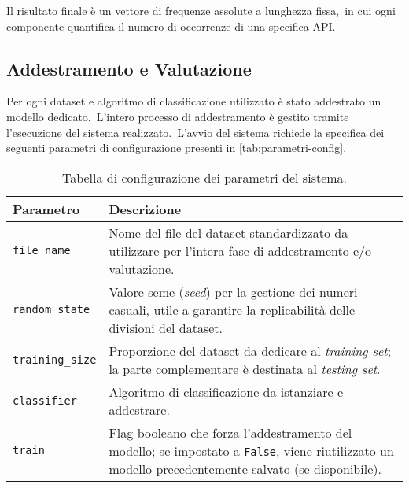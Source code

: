 Il risultato finale è un vettore di frequenze assolute a lunghezza fissa,\
in cui ogni componente quantifica il numero di occorrenze di una specifica API.

\subsection{Addestramento e Valutazione}

Per ogni dataset e algoritmo di classificazione utilizzato è stato addestrato un modello dedicato.\
L'intero processo di addestramento è gestito tramite l'esecuzione del sistema realizzato.\
L'avvio del sistema richiede la specifica dei seguenti parametri di configurazione presenti in \autoref{tab:parametri-config}.

\begin{table}[h!]
    \centering
    \begin{tabular}{lp{10cm}}
        \hline
        \textbf{Parametro}      & \textbf{Descrizione}                                                                                                                                        \\
        \hline
        \texttt{file\_name}     & Nome del file del dataset standardizzato da utilizzare per l’intera fase di addestramento e/o valutazione.                                                  \\[0.5em]
        \texttt{random\_state}  & Valore seme (\textit{seed}) per la gestione dei numeri casuali, utile a garantire la replicabilità delle divisioni del dataset.                             \\[0.5em]
        \texttt{training\_size} & Proporzione del dataset da dedicare al \textit{training set}; la parte complementare è destinata al \textit{testing set}.                                   \\[0.5em]
        \texttt{classifier}     & Algoritmo di classificazione da istanziare e addestrare.                                                                                                    \\[0.5em]
        \texttt{train}          & Flag booleano che forza l’addestramento del modello; se impostato a \texttt{False}, viene riutilizzato un modello precedentemente salvato (se disponibile). \\
        \hline
    \end{tabular}
    \caption{Tabella di configurazione dei parametri del sistema.}
    \label{tab:parametri-config}
\end{table}

